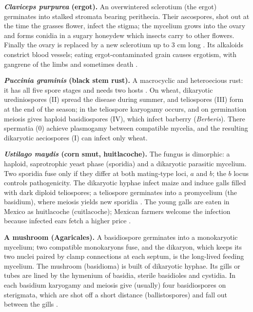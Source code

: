\textbf{\emph{Claviceps purpurea}
(ergot).}
An overwintered sclerotium (the ergot)
germinates into stalked stromata bearing
perithecia. Their ascospores, shot out at the
time the grasses flower, infect the stigma;
the mycelium grows into the ovary and forms
conidia in a sugary honeydew which insects
carry to other flowers. Finally the ovary is
replaced by a new sclerotium up to 3 cm long
\cite[Section 12.5]{webster2007fungi}.
Its alkaloids constrict blood vessels;
eating ergot-contaminated grain causes
ergotism, with gangrene of the limbs and
sometimes death
\cite[Section 12.5]{webster2007fungi}.

\textbf{\emph{Puccinia graminis} (black
stem rust).}
A macrocyclic and heteroecious rust: it has
all five spore stages and needs two hosts
\cite[Chapter 22]{webster2007fungi}.
On wheat, dikaryotic urediniospores (II)
spread the disease during summer, and
teliospores (III) form at the end of the
season; in the teliospore karyogamy occurs,
and on germination meiosis gives haploid
basidiospores (IV), which infect barberry
(\emph{Berberis}). There spermatia (0)
achieve plasmogamy between compatible
mycelia, and the resulting dikaryotic
aeciospores (I) can infect only wheat.

\textbf{\emph{Ustilago maydis} (corn
smut, huitlacoche).}
The fungus is dimorphic: a haploid,
saprotrophic yeast phase (sporidia) and a
dikaryotic parasitic mycelium. Two sporidia
fuse only if they differ at both mating-type
loci, $a$ and $b$; the $b$ locus controls
pathogenicity. The dikaryotic hyphae infect
maize and induce galls filled with dark
diploid teliospores; a teliospore germinates
into a promycelium (the basidium), where
meiosis yields new sporidia
\cite[Chapters 18 and 23]{webster2007fungi}.
The young galls are eaten in Mexico as
huitlacoche (cuitlacoche); Mexican farmers
welcome the infection because infected ears
fetch a higher price
\cite[pp.~254--255]{hall2003edible}.

\textbf{A mushroom (Agaricales).}
A basidiospore germinates into a
monokaryotic mycelium; two compatible
monokaryons fuse, and the dikaryon, which
keeps its two nuclei paired by clamp
connections at each septum, is the long-lived
feeding mycelium. The mushroom (basidioma) is
built of dikaryotic hyphae. Its gills or
tubes are lined by the hymenium of basidia,
sterile basidioles and cystidia. In each
basidium karyogamy and meiosis give
(usually) four basidiospores on sterigmata,
which are shot off a short distance
(ballistospores) and fall out between the
gills
\cite[Chapter 18]{webster2007fungi}.

